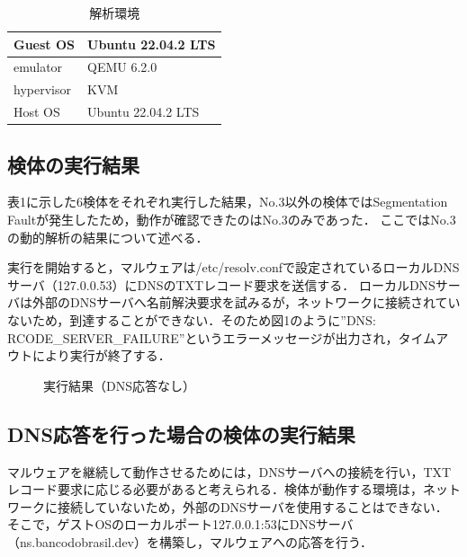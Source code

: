 \documentclass[submit,techreq,noauthor]{eco}	%
\begin{document}
\begin{table}[H]
  \caption{解析環境}
  \label{table: 解析環境}
  \centering
  \begin{tabular}{|l|l|}
  \hline
  Guest OS   & Ubuntu 22.04.2 LTS \\ \hline
  emulator   & QEMU 6.2.0         \\ \hline
  hypervisor & KVM                \\ \hline
  Host OS    & Ubuntu 22.04.2 LTS \\ \hline
  \end{tabular}
\end{table}

\subsection{検体の実行結果}
表1に示した6検体をそれぞれ実行した結果，No.3以外の検体ではSegmentation Faultが発生したため，動作が確認できたのはNo.3のみであった．
ここではNo.3の動的解析の結果について述べる．

実行を開始すると，マルウェアは/etc/resolv.confで設定されているローカルDNSサーバ（127.0.0.53）にDNSのTXTレコード要求を送信する．
ローカルDNSサーバは外部のDNSサーバへ名前解決要求を試みるが，ネットワークに接続されていないため，到達することができない．そのため図1のように”DNS: RCODE\_SERVER\_FAILURE”というエラーメッセージが出力され，タイムアウトにより実行が終了する．

\begin{figure}[H]
	\centering
	\caption{実行結果（DNS応答なし）}
	\label{fig:001}
\end{figure}

\subsection{DNS応答を行った場合の検体の実行結果}
マルウェアを継続して動作させるためには，DNSサーバへの接続を行い，TXTレコード要求に応じる必要があると考えられる．検体が動作する環境は，ネットワークに接続していないため，外部のDNSサーバを使用することはできない．
そこで，ゲストOSのローカルポート127.0.0.1:53にDNSサーバ（ns.bancodobrasil.dev）を構築し，マルウェアへの応答を行う．
\end{document}
